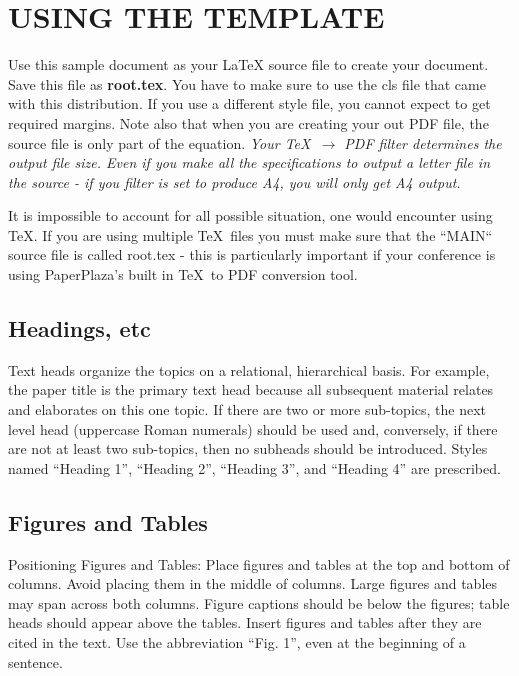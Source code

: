 \documentclass[a4paper, 10pt, conference]{ieeeconf}
\begin{document}
    \section{USING THE TEMPLATE}

    Use this sample document as your LaTeX source file to create your document. Save this file as {\bf root.tex}. You have to make sure to use the cls file that came with this distribution. If you use a different style file, you cannot expect to get required margins. Note also that when you are creating your out PDF file, the source file is only part of the equation. \emph{Your \TeX\ $\rightarrow$ PDF filter determines the output file size. Even if you make all the specifications to output a letter file in the source - if you filter is set to produce A4, you will only get A4 output.}

    It is impossible to account for all possible situation, one would encounter using \TeX. If you are using multiple \TeX\ files you must make sure that the ``MAIN`` source file is called root.tex - this is particularly important if your conference is using PaperPlaza's built in \TeX\ to PDF conversion tool.

    \subsection{Headings, etc}

    Text heads organize the topics on a relational, hierarchical basis. For example, the paper title is the primary text head because all subsequent material relates and elaborates on this one topic. If there are two or more sub-topics, the next level head (uppercase Roman numerals) should be used and, conversely, if there are not at least two sub-topics, then no subheads should be introduced. Styles named ``Heading 1'', ``Heading 2'', ``Heading 3'', and ``Heading 4'' are prescribed.

    \subsection{Figures and Tables}

    Positioning Figures and Tables: Place figures and tables at the top and bottom of columns. Avoid placing them in the middle of columns. Large figures and tables may span across both columns. Figure captions should be below the figures; table heads should appear above the tables. Insert figures and tables after they are cited in the text. Use the abbreviation ``Fig. 1'', even at the beginning of a sentence.
\end{document}
